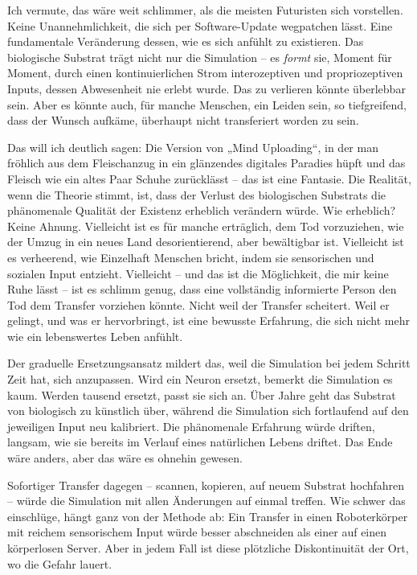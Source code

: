 \documentclass[11pt, twoside, openright]{book}
\begin{document}
Ich vermute, das wäre weit schlimmer, als die meisten Futuristen sich vorstellen. Keine Unannehmlichkeit, die sich per Software-Update wegpatchen lässt. Eine fundamentale Veränderung dessen, wie es sich anfühlt zu existieren. Das biologische Substrat trägt nicht nur die Simulation -- es \textit{formt} sie, Moment für Moment, durch einen kontinuierlichen Strom interozeptiven und propriozeptiven Inputs, dessen Abwesenheit nie erlebt wurde. Das zu verlieren könnte überlebbar sein. Aber es könnte auch, für manche Menschen, ein Leiden sein, so tiefgreifend, dass der Wunsch aufkäme, überhaupt nicht transferiert worden zu sein.

Das will ich deutlich sagen: Die Version von „Mind Uploading“, in der man fröhlich aus dem Fleischanzug in ein glänzendes digitales Paradies hüpft und das Fleisch wie ein altes Paar Schuhe zurücklässt -- das ist eine Fantasie. Die Realität, wenn die Theorie stimmt, ist, dass der Verlust des biologischen Substrats die phänomenale Qualität der Existenz erheblich verändern würde. Wie erheblich? Keine Ahnung. Vielleicht ist es für manche erträglich, dem Tod vorzuziehen, wie der Umzug in ein neues Land desorientierend, aber bewältigbar ist. Vielleicht ist es verheerend, wie Einzelhaft Menschen bricht, indem sie sensorischen und sozialen Input entzieht. Vielleicht -- und das ist die Möglichkeit, die mir keine Ruhe lässt -- ist es schlimm genug, dass eine vollständig informierte Person den Tod dem Transfer vorziehen könnte. Nicht weil der Transfer scheitert. Weil er gelingt, und was er hervorbringt, ist eine bewusste Erfahrung, die sich nicht mehr wie ein lebenswertes Leben anfühlt.

Der graduelle Ersetzungsansatz mildert das, weil die Simulation bei jedem Schritt Zeit hat, sich anzupassen. Wird ein Neuron ersetzt, bemerkt die Simulation es kaum. Werden tausend ersetzt, passt sie sich an. Über Jahre geht das Substrat von biologisch zu künstlich über, während die Simulation sich fortlaufend auf den jeweiligen Input neu kalibriert. Die phänomenale Erfahrung würde driften, langsam, wie sie bereits im Verlauf eines natürlichen Lebens driftet. Das Ende wäre anders, aber das wäre es ohnehin gewesen.

Sofortiger Transfer dagegen -- scannen, kopieren, auf neuem Substrat hochfahren -- würde die Simulation mit allen Änderungen auf einmal treffen. Wie schwer das einschlüge, hängt ganz von der Methode ab: Ein Transfer in einen Roboterkörper mit reichem sensorischem Input würde besser abschneiden als einer auf einen körperlosen Server. Aber in jedem Fall ist diese plötzliche Diskontinuität der Ort, wo die Gefahr lauert.
\end{document}
